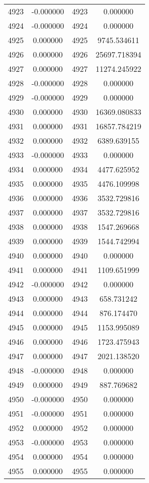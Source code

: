 \documentclass[12pt]{article}
\begin{document}
\begin{longtable}{@{}cccc@{}}
4923 & -0.000000 & 4923 & 0.000000 \\
4924 & -0.000000 & 4924 & 0.000000 \\
4925 & 0.000000 & 4925 & 9745.534611 \\
4926 & 0.000000 & 4926 & 25697.718394 \\
4927 & 0.000000 & 4927 & 11274.245922 \\
4928 & -0.000000 & 4928 & 0.000000 \\
4929 & -0.000000 & 4929 & 0.000000 \\
4930 & 0.000000 & 4930 & 16369.080833 \\
4931 & 0.000000 & 4931 & 16857.784219 \\
4932 & 0.000000 & 4932 & 6389.639155 \\
4933 & -0.000000 & 4933 & 0.000000 \\
4934 & 0.000000 & 4934 & 4477.625952 \\
4935 & 0.000000 & 4935 & 4476.109998 \\
4936 & 0.000000 & 4936 & 3532.729816 \\
4937 & 0.000000 & 4937 & 3532.729816 \\
4938 & 0.000000 & 4938 & 1547.269668 \\
4939 & 0.000000 & 4939 & 1544.742994 \\
4940 & 0.000000 & 4940 & 0.000000 \\
4941 & 0.000000 & 4941 & 1109.651999 \\
4942 & -0.000000 & 4942 & 0.000000 \\
4943 & 0.000000 & 4943 & 658.731242 \\
4944 & 0.000000 & 4944 & 876.174470 \\
4945 & 0.000000 & 4945 & 1153.995089 \\
4946 & 0.000000 & 4946 & 1723.475943 \\
4947 & 0.000000 & 4947 & 2021.138520 \\
4948 & -0.000000 & 4948 & 0.000000 \\
4949 & 0.000000 & 4949 & 887.769682 \\
4950 & -0.000000 & 4950 & 0.000000 \\
4951 & -0.000000 & 4951 & 0.000000 \\
4952 & 0.000000 & 4952 & 0.000000 \\
4953 & -0.000000 & 4953 & 0.000000 \\
4954 & 0.000000 & 4954 & 0.000000 \\
4955 & 0.000000 & 4955 & 0.000000 \\

\end{longtable}
\end{document}
